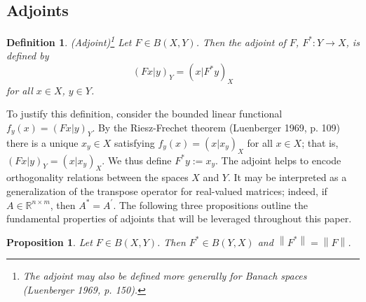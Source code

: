 \documentclass[12pt]{article}
\newcommand*{\norm}[1]{\left\lVert#1\right\rVert}
\newtheorem{definition}{Definition}
\newtheorem{prop}{Proposition}
\begin{document}
\subsection{Adjoints}
 \begin{definition} 
 (Adjoint)\footnote{The adjoint may also be defined more generally for Banach spaces (Luenberger 1969, p. 150).} 
 	Let $F \in B(X, Y)$. Then the adjoint of $F$, $F^*: Y \to X$, is defined by 
 	\begin{equation*} 
	(Fx|y)_Y = (x|F^*y)_X
 	\end{equation*} 
	for all $x \in X$, $y \in Y$. 
 \end{definition} 
To justify this definition, consider the bounded linear functional $f_y(x) = (Fx|y)_Y$. By the Riesz-Frechet theorem (Luenberger 1969, p. 109)
there is a unique $x_y \in X$ satisfying $f_y(x) = (x|x_y)_X$ for all $x \in X$; that is, $(Fx|y)_Y = (x|x_y)_X$. 
We thus define $F^*y := x_y$. The adjoint helps to encode orthogonality relations between the spaces $X$ and $Y$. 
It may be interpreted as a generalization of the transpose operator for real-valued matrices; indeed, if $A \in \mathbb{R}^{n \times m}$, 
then $A^* = A^\prime$. The following three propositions outline the fundamental properties of adjoints that will be leveraged throughout
this paper. 

\begin{prop} 
Let $F \in B(X, Y)$. Then $F^* \in B(Y, X)$ and $\norm{F^*} = \norm{F}$. 
\end{prop}
\end{document}
